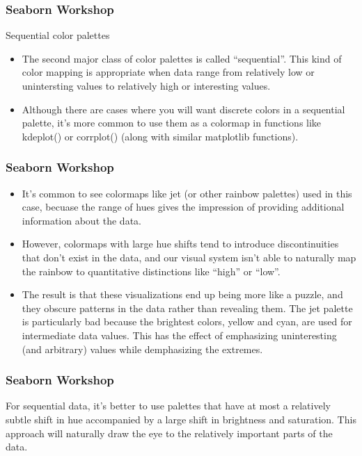 
\begin{frame}[fragile]
\frametitle{Seaborn Workshop}
\large

Sequential color palettes
\begin{itemize}
\item The second major class of color palettes is called “sequential”. This kind of color mapping is appropriate when data range from relatively low or unintersting values to relatively high or interesting values. 
\item Although there are cases where you will want discrete colors in a sequential palette, it’s more common to use them as a colormap in functions like kdeplot() or corrplot() (along with similar matplotlib functions).
\end{itemize}

\end{frame}
\begin{frame}[fragile]
	
	\frametitle{Seaborn Workshop}
	\large
\begin{itemize}
\item It’s common to see colormaps like jet (or other rainbow palettes) used in this case, becuase the range of hues gives the impression of providing additional information about the data. 
\item However, colormaps with large hue shifts tend to introduce discontinuities that don’t exist in the data, and our visual system isn’t able to naturally map the rainbow to quantitative distinctions like “high” or “low”. 
\item The result is that these visualizations end up being more like a puzzle, and they obscure patterns in the data rather than revealing them. The jet palette is particularly bad because the brightest colors, yellow and cyan, are used for intermediate data values. This has the effect of emphasizing uninteresting (and arbitrary) values while demphasizing the extremes.
\end{itemize}
\end{frame}
\begin{frame}[fragile]
	\frametitle{Seaborn Workshop}
	\large
For sequential data, it’s better to use palettes that have at most a relatively subtle shift in hue accompanied by a large shift in brightness and saturation. This approach will naturally draw the eye to the relatively important parts of the data.
\end{frame}
